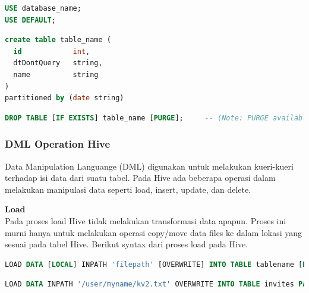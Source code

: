 \begin{lstlisting}[language=sql,basicstyle=\tiny,caption=DDL untuk use database]
USE database_name;
USE DEFAULT;
\end{lstlisting}

\begin{lstlisting}[language=sql,basicstyle=\tiny,caption=Contoh DDL untuk membuat tabel dengan partisi]
create table table_name (
  id			int,
  dtDontQuery	string,
  name			string
)
partitioned by (date string)
\end{lstlisting}

\begin{lstlisting}[language=sql,basicstyle=\tiny,caption=Contoh DDL untuk drop tabel]
DROP TABLE [IF EXISTS] table_name [PURGE];     -- (Note: PURGE available in Hive 0.14.0 and later)
\end{lstlisting}

\subsubsection{DML Operation Hive}
Data Manipulation Languange (DML) digunakan untuk melakukan kueri-kueri terhadap isi data dari suatu tabel. Pada Hive ada beberapa operasi dalam melakukan manipulasi data seperti load, insert, update, dan delete. 

\textbf{Load}\\
Pada proses load Hive tidak melakukan transformasi data apapun. Proses ini murni hanya untuk melakukan operasi copy/move data files ke dalam lokasi yang sesuai pada tabel Hive. Berikut syntax dari proses load pada Hive.

\begin{lstlisting}[language=sql,basicstyle=\tiny,caption=Syntax DML Load]
LOAD DATA [LOCAL] INPATH 'filepath' [OVERWRITE] INTO TABLE tablename [PARTITION (partcol1=val1, partcol2=val2 ...)]
\end{lstlisting}

\begin{lstlisting}[language=sql,basicstyle=\tiny,caption=Contoh DML Load]
LOAD DATA INPATH '/user/myname/kv2.txt' OVERWRITE INTO TABLE invites PARTITION (ds='2008-08-15');
\end{lstlisting}

